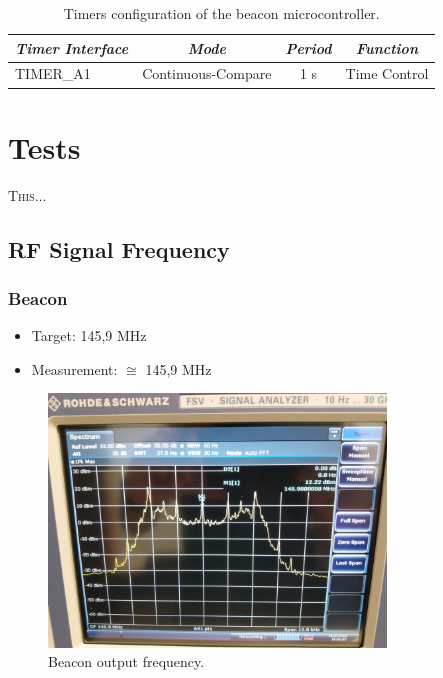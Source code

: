 \documentclass[12pt]{book}
\begin{document}
\begin{table}[!h]
	\begin{center}
		\begin{tabular}{lccc}
			\toprule[1.5pt]
			\textit{Timer Interface} & \textit{Mode} & \textit{Period} & \textit{Function} \\
			\midrule
			TIMER\_A1 & Continuous-Compare & 1 s & Time Control \\
			\bottomrule[1.5pt]
		\end{tabular}
		\caption{Timers configuration of the beacon microcontroller.}
		\label{tab:beacon-uc-timers-config}
	\end{center}
\end{table}


\chapter{Tests}

\lettrine{T}{his}...

\section{RF Signal Frequency}

\subsection{Beacon}

\begin{itemize}
    \item Target: 145,9 MHz
    \item Measurement: $\cong$ 145,9 MHz
\end{itemize}

\begin{figure}[H]
    \begin{center}
        \includegraphics[width=0.8\textwidth]{figures/tests/beacon_frequency.jpg}
        \caption{Beacon output frequency.}
        \label{fig:beacon-frequency}
    \end{center}
\end{figure}
\end{document}
